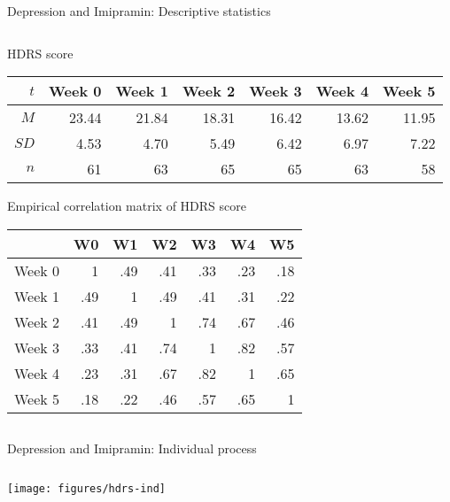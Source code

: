 \documentclass{beamer}
\begin{document}
\begin{frame}{Depression and Imipramin: Descriptive statistics}
  {\citep{ReisbyGram77}}
\begin{columns}
\begin{column}{12cm}
HDRS score
\begin{center}
\begin{tabular}{rrrrrrr}
  \hline
  $t$ & Week 0 & Week 1 & Week 2 & Week 3 & Week 4 & Week 5 \\ 
  \hline
  $M$  & 23.44 & 21.84 & 18.31 & 16.42 & 13.62 & 11.95 \\ 
  $SD$ &  4.53 & 4.70  & 5.49  & 6.42  & 6.97  & 7.22 \\ 
  $n$  & 61    & 63    & 65    & 65    & 63    & 58    \\ 
  \hline
\end{tabular}
\end{center}
Empirical correlation matrix of HDRS score
\begin{center}
\begin{tabular}{rrrrrrr}
  \hline
   & W0 & W1 & W2 & W3 & W4 & W5 \\ 
  \hline
  Week 0 &   1 & .49 & .41 & .33 & .23 & .18 \\ 
  Week 1 & .49 &   1 & .49 & .41 & .31 & .22 \\ 
  Week 2 & .41 & .49 &   1 & .74 & .67 & .46 \\ 
  Week 3 & .33 & .41 & .74 &   1 & .82 & .57 \\ 
  Week 4 & .23 & .31 & .67 & .82 &   1 & .65 \\ 
  Week 5 & .18 & .22 & .46 & .57 & .65 &   1 \\ 
  \hline
\end{tabular}
\end{center}
\end{column}
\end{columns}
\end{frame}


\begin{frame}{Depression and Imipramin: Individual process}
  {\citep{ReisbyGram77}}
\begin{columns}
\begin{column}{12cm}
\vspace{-.45cm}
\texttt{[image: figures/hdrs-ind]}
\end{column}
\end{columns}
\end{frame}
\end{document}
